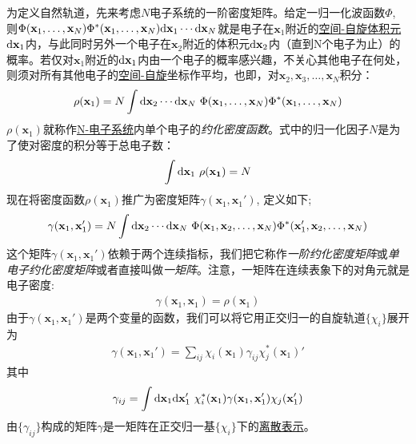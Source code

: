 为定义自然轨道，先来考虑$N$电子系统的一阶密度矩阵。给定一归一化波函数$\Phi$, 则$\Phi(\mathbf{x}_1,\ldots,\mathbf{x}_N)\Phi^*(\mathbf{x}_1,\ldots,\mathbf{x}_N)\ddx_1\cdots\ddx_N$就是电子在$\mathbf{x}_1$附近的\underline{\underline{空间-自旋}体积元}$\ddx_1$内，与此同时另外一个电子在$\mathbf{x}_2$附近的体积元$\ddx_2$内（直到N个电子为止）的概率。若仅对$\mathbf{x}_1$附近的$\ddx_1$内由一个电子的概率感兴趣，不关心其他电子在何处，则须对所有其他电子的\underline{空间-自旋}坐标作平均，也即，对$\mathbf{x}_2,\mathbf{x}_3,\ldots,\mathbf{x}_N$积分：
\begin{align}
\rho(\mathbf{x}_1) = N \int\ddx_2\cdots\ddx_N \,\, \Phi(\mathbf{x}_1,\ldots,\mathbf{x}_N)\Phi^*(\mathbf{x}_1,\ldots,\mathbf{x}_N)
\end{align}
$\rho(\mathbf{x}_1)$就称作\underline{N-电子系统}内单个电子的\emph{约化密度函数}。式中的归一化因子$N$是为了使对密度的积分等于总电子数：
\begin{align}
\int\ddx_1\,\,\rho(\mathbf{x_1}) = N
\end{align}
现在将密度函数$\rho(\mathbf{x}_1)$推广为密度矩阵$\gamma(\mathbf{x}_1,\mathbf{x}_1')$, 定义如下;
\begin{align}
\label{4.35}
\gamma(\mathbf{x}_1,\mathbf{x}_1') = N \int\ddx_2\cdots\ddx_N \,\, \Phi(\mathbf{x}_1,\mathbf{x}_2,\ldots,\mathbf{x}_N)\Phi^*(\mathbf{x}_1',\mathbf{x}_2,\ldots,\mathbf{x}_N)
\end{align}
这个矩阵$\gamma(\mathbf{x}_1,\mathbf{x}_1')$依赖于两个连续指标，我们把它称作\emph{一阶约化密度矩阵}或\emph{单电子约化密度矩阵}或者直接叫做\emph{一矩阵}。注意，一矩阵在连续表象下的对角元就是电子密度:
\begin{align}
\gamma(\mathbf{x}_1,\mathbf{x}_1) = \rho(\mathbf{x}_1)
\end{align}
由于$\gamma(\mathbf{x}_1,\mathbf{x}_1')$是两个变量的函数，我们可以将它用正交归一的\hft 自旋轨道$\{\chi_i\}$展开为
\begin{align}
\gamma(\mathbf{x}_1,\mathbf{x}_1') = \sum_{ij} \chi_i(\mathbf{x}_1) \gamma_{ij} \chi_j^*(\mathbf{x}_1)'
\end{align}
其中
\begin{align}
\gamma_{ij} = \int\ddx_1\ddx_1'\,\,\chi_i^*(\mathbf{x}_1)\gamma(\mathbf{x}_1,\mathbf{x}_1')\chi_j(\mathbf{x}_1')
\end{align}
由$\{\gamma_{ij}\}$构成的矩阵$\gamma$是一矩阵在正交归一基$\{\chi_i\}$下的\underline{离散表示}。

